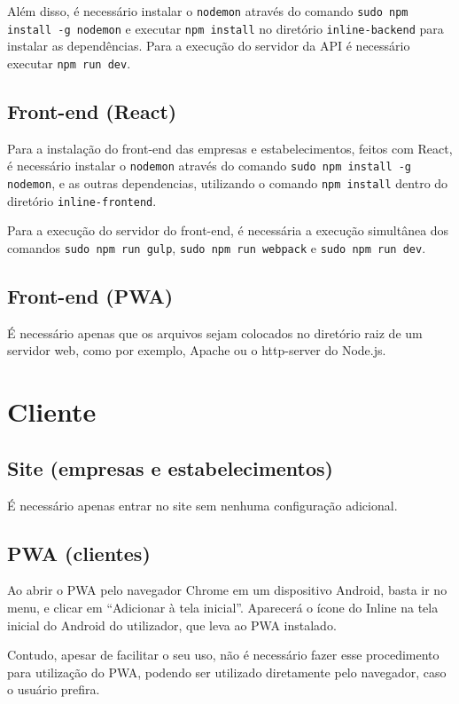\documentclass{book}
\begin{document}
Além disso, é necessário instalar o \verb|nodemon| através do comando
\verb|sudo npm install -g nodemon| e executar \verb|npm install| no diretório
\verb|inline-backend| para instalar as dependências. Para a execução do servidor
da API é necessário executar \verb|npm run dev|.

\subsection{Front-end (React)}
Para a instalação do front-end das empresas e estabelecimentos, feitos com
React, é necessário instalar o \verb|nodemon| através do comando
\verb|sudo npm install -g nodemon|, e as outras dependencias, utilizando o
comando \verb|npm install| dentro do diretório \verb|inline-frontend|.

Para a execução do servidor do front-end, é necessária a execução simultânea dos
comandos \verb|sudo npm run gulp|, \verb|sudo npm run webpack| e
\verb|sudo npm run dev|.

\subsection{Front-end (PWA)}
É necessário apenas que os arquivos sejam colocados no diretório raiz de um
servidor web, como por exemplo, Apache ou o http-server do Node.js.

\section{Cliente}

\subsection{Site (empresas e estabelecimentos)}
É necessário apenas entrar no site sem nenhuma configuração adicional.

\subsection{PWA (clientes)}
Ao abrir o PWA pelo navegador Chrome em um dispositivo Android, basta ir no
menu, e clicar em ``Adicionar à tela inicial''. Aparecerá o ícone do Inline
na tela inicial do Android do utilizador, que leva ao PWA instalado.

Contudo, apesar de facilitar o seu uso, não é necessário fazer esse procedimento
para utilização do PWA, podendo ser utilizado diretamente pelo navegador, caso o
usuário prefira.
\end{document}
